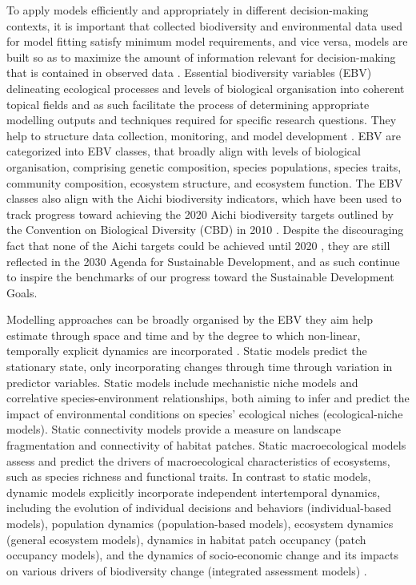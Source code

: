 To apply models efficiently and appropriately in different decision-making contexts, it is important that collected biodiversity and environmental data used for model fitting satisfy minimum model requirements, and vice versa, models are built so as to maximize the amount of information relevant for decision-making that is contained in observed data \citep{ipbes_summary_2016}. Essential biodiversity variables (EBV) delineating ecological processes and levels of biological organisation into coherent topical fields \citep{pereira_essential_2013} and as such facilitate the process of determining appropriate modelling outputs and techniques required for specific research questions. They help to structure data collection, monitoring, and model development \citep{pereira_essential_2013, ipbes_summary_2016}. EBV are categorized into EBV classes, that broadly align with levels of biological organisation, comprising genetic composition, species populations, species traits, community composition, ecosystem structure, and ecosystem function. The EBV classes also align with the Aichi biodiversity indicators, which have been used to track progress toward achieving the 2020 Aichi biodiversity targets outlined by the Convention on Biological Diversity (CBD) in 2010 \citep{scbd_global_2010, butchart_global_2010}. Despite the discouraging fact that none of the Aichi targets could be achieved until 2020 \citep{scbd_global_2010}, they are still reflected in the 2030 Agenda for Sustainable Development, and as such continue to inspire the benchmarks of our progress toward the Sustainable Development Goals.

Modelling approaches can be broadly organised by the EBV they aim help estimate through space and time and by the degree to which non-linear, temporally explicit dynamics are incorporated \citep[static versus dynamic models,][]{zurell_spatially-explicit_2021}. Static models predict the stationary state, only incorporating changes through time through variation in predictor variables. Static models include mechanistic niche models and correlative species-environment relationships, both aiming to infer and predict the impact of environmental conditions on species' ecological niches (ecological-niche models). Static connectivity models provide a measure on landscape fragmentation and connectivity of habitat patches. Static macroecological models assess and predict the drivers of macroecological characteristics of ecosystems, such as species richness and functional traits. In contrast to static models, dynamic models explicitly incorporate independent intertemporal dynamics, including the evolution of individual decisions and behaviors (individual-based models), population dynamics (population-based models), ecosystem dynamics (general ecosystem models), dynamics in habitat patch occupancy (patch occupancy models), and the dynamics of socio-economic change and its impacts on various drivers of biodiversity change (integrated assessment models) \citep{zurell_spatially-explicit_2021}.

